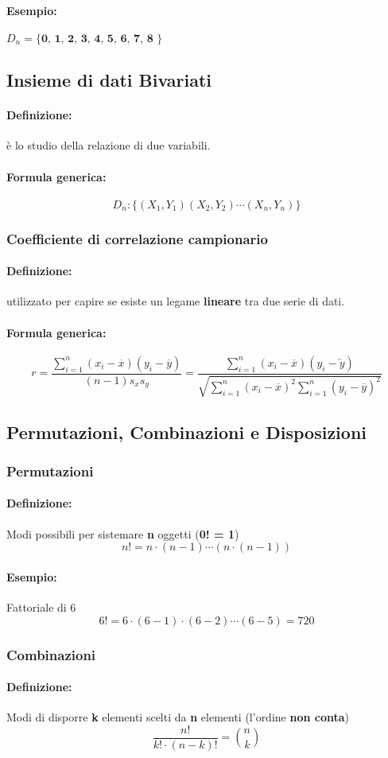 \documentclass[]{article}
\newcommand{\definizione}{\paragraph{Definizione:}}
\newcommand{\formula}{\paragraph{Formula generica:}}
\begin{document}
    \paragraph{Esempio:} $D_n = \textbf{\{ 0, 1, 2, 3, 4, 5, 6, 7, 8 \}}$

    \subsection{Insieme di dati Bivariati}
    \definizione è lo studio della relazione di due variabili.
    \formula \[ D_n : \{(X_1, Y_1) (X_2, Y_2) \cdots (X_n, Y_n)\}\]

    \subsubsection{Coefficiente di correlazione campionario}
    \definizione utilizzato per capire se esiste un legame \textbf{lineare} tra due serie di dati.
    \formula 
    \begin{equation*}
        r = \frac{\sum_{i = 1}^{n}(x_i - \overline{x}) (y_i - \overline{y})}{(n-1) s_x s_y} = \frac{\sum_{i = 1}^{n} (x_i - \overline{x}) (y_i - \overleftarrow{y})}{\sqrt{\sum_{i = 1}^{n} (x_i - \overline{x})^2 \sum_{i = 1}^{n} (y_i - \overline{y})^2}}
    \end{equation*}
    \subsection{Permutazioni, Combinazioni e Disposizioni}
    \subsubsection{Permutazioni}
    \definizione Modi possibili per sistemare \textbf{n} oggetti (\textbf{0! = 1})
    \[ n! = n \cdot (n-1) \cdots (n \cdot (n-1)) \]
    \paragraph{Esempio:} Fattoriale di 6
    \[ 6! = 6 \cdot (6-1) \cdot (6-2) \cdots (6-5) = 720 \]

    \subsubsection{Combinazioni}
    \definizione Modi di disporre \textbf{k} elementi scelti da \textbf{n} elementi (l'ordine \textbf{non conta})
    \[ \frac{n!}{k! \cdot (n-k)!} = \binom{n}{k} \]
\end{document}
